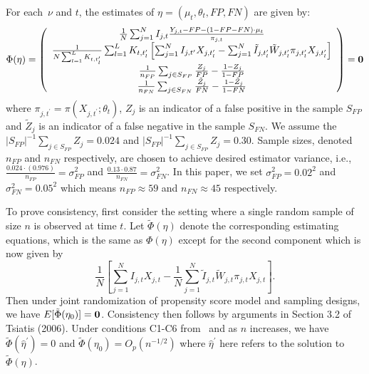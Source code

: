 \documentclass[11pt]{amsart}
\numberwithin{equation}{section}
\theoremstyle{plain}
\begin{document}
For each~$\nu$ and $t$, the estimates of $\eta = (\mu_t, \theta_t, FP, FN)$ are given by:
$$
\Phi (\eta) = \left (
\begin{array}{c}
\frac{1}{N} \sum_{j=1}^N I_{j,t} \frac{Y_{j,t} - FP - (1-FP-FN) \cdot \mu_t}{\pi_{j,t}} \\
\frac{1}{N \sum_{l=1}^L K_{t,t_l^\prime}} \sum_{l=1}^L K_{t,t_l^\prime} \left[ \sum_{j=1}^N I_{j,t^\prime} X_{j,t^\prime_l} - \sum_{j = 1}^N \tilde I_{j,t_l^\prime} \tilde W_{j,t_l^\prime}  \pi_{j,t_l^\prime} X_{j,t_l^\prime} \right] \\
\frac{1}{n_{FP}} \sum_{j \in S_{FP}} \frac{Z_j}{FP} - \frac{1-Z_j}{1-FP} \\
\frac{1}{n_{FN}} \sum_{j \in S_{FN}} \frac{\tilde Z_j}{FN} - \frac{1-\tilde Z_j}{1-FN} \\
\end{array}
\right ) = {\bf 0}
$$
where $\pi_{j,t^\prime} = \pi (X_{j,t^\prime}; \theta_t)$, $Z_j$ is an indicator of a false positive in the sample $S_{FP}$  and $\tilde Z_j$ is an indicator of a false negative in the sample $S_{FN}$.  We assume the $|S_{FP}|^{-1} \sum_{j \in S_{FP}} Z_j = 0.024$ and $|S_{FP}|^{-1} \sum_{j \in S_{FP}} Z_j = 0.30$.  Sample sizes, denoted $n_{FP}$ and $n_{FN}$ respectively, are chosen to achieve desired estimator variance, i.e., $\frac{0.024 \cdot (0.976)}{n_{FP}} = \sigma^2_{FP}$ and $\frac{0.13 \cdot 0.87}{n_{FN}} = \sigma^2_{FN}$. In this paper, we set $\sigma^2_{FP} = 0.02^2$ and $\sigma_{FN}^2 = 0.05^2$ which means $n_{FP} \approx 59$ and $n_{FN} \approx 45$ respectively.

To prove consistency, first consider the setting where a single random sample of size $n$ is observed at time $t$.  Let $\tilde \Phi (\eta)$ denote the corresponding estimating equations, which is the same as $\Phi(\eta)$ except for the second component which is now given by
$$
\frac{1}{N} \left[ \sum_{j=1}^N I_{j,t} X_{j,t} - \frac{1}{N} \sum_{j = 1}^N \tilde I_{j,t} \tilde W_{j,t}  \pi_{j,t} X_{j,t} \right].
$$
Then under joint randomization of propensity score model and sampling designs, we have $E [ \tilde \Phi (\eta_0) ] = {\bf 0}$.  Consistency then follows by arguments in Section 3.2 of Tsiatis (2006). Under conditions C1-C6 from~\cite{Chen2019} and as $n$ increases, we have $\tilde \Phi (\hat \eta^\prime) = 0$ and $\tilde \Phi(\eta_0) = O_p ( n^{-1/2} )$ where $\hat \eta^\prime$ here refers to the solution to $\tilde \Phi (\eta)$.
\end{document}
